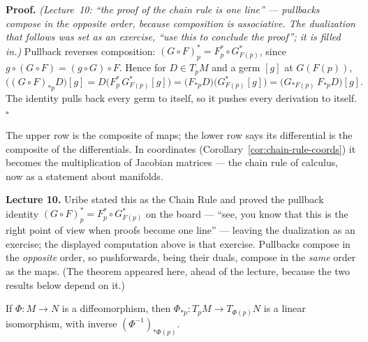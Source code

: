 \documentclass[11pt]{report}
\makeatletter
\newcounter{thmcounter}[section]
\renewenvironment{proof}[1][Proof]{\noindent\textbf{#1.} }{\hfill$\square$\par\vspace{5pt}}
\newcommand{\thmlabel}[1]{\edef\@currentlabel{\arabic{section}.\arabic{thmcounter}}\label{#1}}
\newcommand{\leeref}[1]{\par\smallskip{\raggedleft\footnotesize\textsc{Lee}:\ #1\par}}
\makeatother
\begin{document}
\begin{proof}
\textit{(Lecture~10: ``the proof of the chain rule is one line'' --- pullbacks compose in the opposite order, because composition is associative. The dualization that follows was set as an exercise, ``use this to conclude the proof''; it is filled in.)} Pullback reverses composition: $(G\circ F)_p^* = F_p^* \circ G_{F(p)}^*$, since $g \circ (G \circ F) = (g \circ G) \circ F$. Hence for $D \in T_pM$ and a germ $[g]$ at $G(F(p))$,
\[
\big((G\circ F)_{*p}D\big)[g] = D\big(F_p^*\, G_{F(p)}^*[g]\big) = \big(F_{*p}D\big)\big(G_{F(p)}^*[g]\big) = \big(G_{*F(p)}\,F_{*p}D\big)[g].
\]
The identity pulls back every germ to itself, so it pushes every derivation to itself.
\end{proof}

\begin{center}
\end{center}

The upper row is the composite of maps; the lower row says its differential is the composite of the differentials. In coordinates (Corollary~\ref{cor:chain-rule-coords}) it becomes the multiplication of Jacobian matrices --- the chain rule of calculus, now as a statement about manifolds.

\textbf{Lecture 10.} Uribe stated this as the Chain Rule and proved the pullback identity $(G \circ F)_p^* = F_p^* \circ G_{F(p)}^*$ on the board --- ``see, you know that this is the right point of view when proofs become one line'' --- leaving the dualization as an exercise; the displayed computation above is that exercise. Pullbacks compose in the \emph{opposite} order, so pushforwards, being their duals, compose in the \emph{same} order as the maps. (The theorem appeared here, ahead of the lecture, because the two results below depend on it.)

\begin{corbox}\thmlabel{lem:germs-diffeo}
If $\Phi : M \to N$ is a diffeomorphism, then $\Phi_{*p} : T_pM \to T_{\Phi(p)}N$ is a linear isomorphism, with inverse $(\Phi^{-1})_{*\Phi(p)}$.
\leeref{Proposition 3.6(d)}
\end{corbox}
\end{document}
